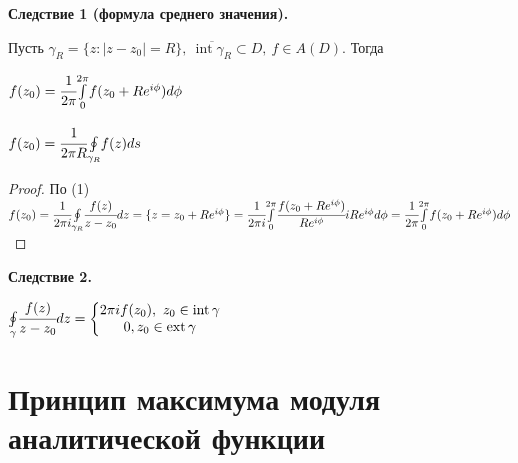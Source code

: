 \documentclass[draft]{article}
\newcommand{\mint}[2]{\underset{#1}{\overset{#2}{\int}}}
\newcommand{\moint}[1]{\underset{#1}{\oint}}
\newcommand{\Int}{\mathop{\mathrm{int}}\nolimits}
\newcommand{\Ext}{\mathop{\mathrm{ext}}\nolimits}
\newcommand{\g}{\gamma}
\renewcommand{\f}{\phi}
\newcommand{\sys}[1]{\left\{\begin{matrix}#1\end{matrix}\right.}
\theoremstyle{remark}
\begin{document}
{\bfseries Следствие 1 (формула среднего значения).}

Пусть $\g_R=\{z\colon|z-z_0|=R\},\ \overline{\Int\g_R}\subset D,\ f\in A(D)$. Тогда 

$f(z_0)=\cfrac{1}{2\pi}\mint{0}{2\pi}f(z_0+Re^{i\f})d\f$

$f(z_0)=\cfrac{1}{2\pi R}\moint{\g_R}f(z)ds$
\begin{proof}
По (1) $f(z_0)=\cfrac{1}{2\pi i}\moint{\g_R}\cfrac{f(z)}{z-z_0}dz=\{z=z_0+Re^{i\f}\}=\cfrac{1}{2\pi i}\mint{0}{2\pi}\cfrac{f(z_0+Re^{i\f})}{Re^{i\f}}iRe^{i\f}d\f=\cfrac{1}{2\pi}\mint{0}{2\pi}f(z_0+Re^{i\f})d\f$
\end{proof}

{\bfseries Следствие 2.}

$\moint{\g}\cfrac{f(z)}{z-z_0}dz=\sys{2\pi if(z_0),\ z_0\in\Int \g \\ 0, z_0\in\Ext\g}$

\newpage

\section{Принцип максимума модуля аналитической функции}
\end{document}
